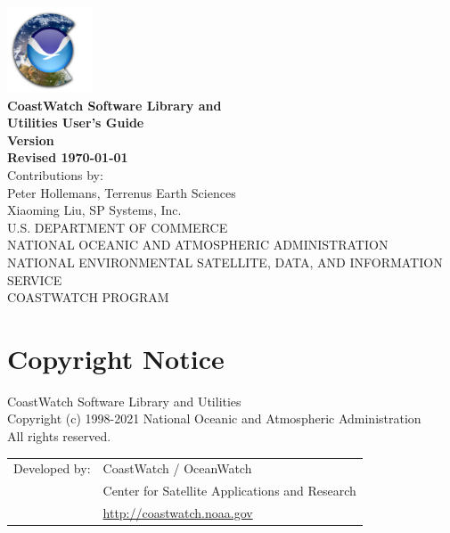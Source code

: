 

\begin{titlepage}

  \begin{center}
    \includegraphics[height=1in]{icons/cdat.png} \\
    \vspace{0.5cm}
    {\Large \bf CoastWatch Software Library and \\ Utilities User's Guide} \\
    \vspace{1cm}
    {\large \bf Version \version \\ Revised \today} \\
    \vspace{6cm} 
    {\small Contributions by: \\ Peter Hollemans, Terrenus Earth Sciences} \\
    {\small Xiaoming Liu, SP Systems, Inc.} \\
    \vspace{2cm}
    {\small U.S. DEPARTMENT OF COMMERCE \\
    NATIONAL OCEANIC AND ATMOSPHERIC ADMINISTRATION \\
    NATIONAL ENVIRONMENTAL SATELLITE, DATA, AND INFORMATION SERVICE \\
    COASTWATCH PROGRAM} \\
  \end{center}

\end{titlepage}



\setcounter{page}{1}

\section*{Copyright Notice}

CoastWatch Software Library and Utilities\\
Copyright (c) 1998-2021 National Oceanic and Atmospheric Administration\\
All rights reserved.

\noindent\begin{tabular}{@{}ll}
Developed by: & CoastWatch / OceanWatch \\
              & Center for Satellite Applications and Research \\
              & \url{http://coastwatch.noaa.gov}
\end{tabular}


